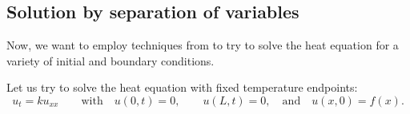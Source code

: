 \documentclass{ximera}
\begin{document}
\subsection{Solution by separation of variables}

Now, we want to employ techniques from  to try to solve the heat equation for a variety of initial and boundary conditions. 

\begin{example} 
    Let us try to solve the heat equation with fixed temperature endpoints:
    \begin{equation*}
        u_t = k u_{xx} \qquad \text{with} \quad u(0,t) = 0 ,\quad \quad u(L,t) = 0, \quad \text{and} \quad u(x,0) = f(x) .
    \end{equation*}
\end{example}
\end{document}
